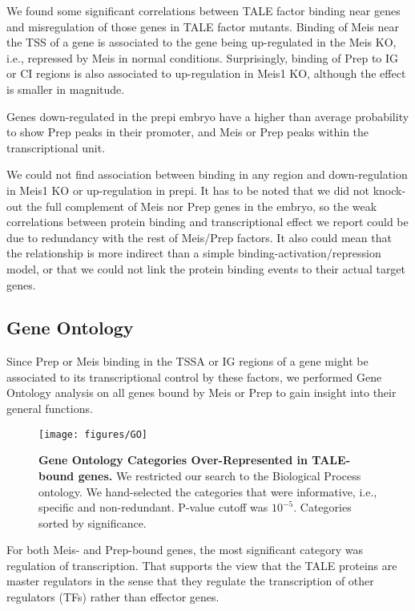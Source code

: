 We found some significant correlations between \ac{TALE} factor binding near genes and misregulation of those genes in \ac{TALE} factor mutants. Binding of Meis near the \ac{TSS} of a gene is associated to the gene being up-regulated in the Meis \ac{KO}, i.e., repressed by Meis in normal conditions. Surprisingly, binding of Prep to \ac{IG} or \ac{CI} regions is also associated to up-regulation in Meis1 \ac{KO}, although the effect is smaller in magnitude. 

Genes down-regulated in the \ac{prepi} embryo have a higher than average probability to show Prep peaks in their promoter, and Meis or Prep peaks within the transcriptional unit. 

We could not find association between binding in any region and down-regulation in Meis1 \ac{KO} or up-regulation in \ac{prepi}. It has to be noted that we did not knock-out the full complement of Meis nor Prep genes in the embryo, so the weak correlations between protein binding and transcriptional effect we report could be due to redundancy with the rest of Meis/Prep factors. It also could mean that the relationship is more indirect than a simple binding-activation/repression model, or that we could not link the protein binding events to their actual target genes. 

\subsection{Gene Ontology}

Since Prep or Meis binding in the \ac{TSSA} or \ac{IG} regions of a gene might be associated to its transcriptional control by these factors, we performed Gene Ontology analysis on all genes bound by Meis or Prep to gain insight into their general functions. 

\begin{SCfigure}[]
  \centering
  \texttt{[image: figures/GO]}
  \caption[Gene Ontology Categories Over-Represented in TALE-bound genes]{\textbf{Gene Ontology Categories Over-Represented in TALE-bound genes.} We restricted our search to the Biological Process ontology. We hand-selected the categories that were informative, i.e., specific and non-redundant. P-value cutoff was $10^{-5}$. Categories sorted by significance.}
  \label{fig:GO}
\end{SCfigure}

For both Meis- and Prep-bound genes, the most significant category was regulation of transcription. That supports the view that the \ac{TALE} proteins are master regulators in the sense that they regulate the transcription of other regulators (\acp{TF}) rather than effector genes. 


